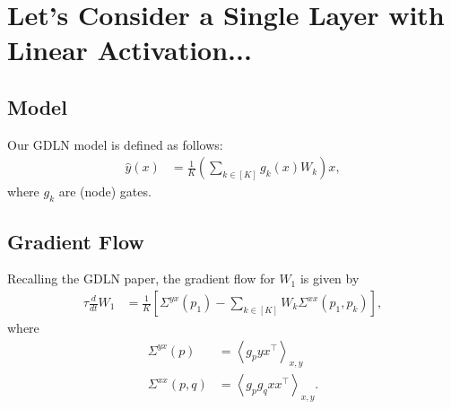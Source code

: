 \documentclass{article}
\begin{document}
\section{Let's Consider a Single Layer with Linear Activation...}

\subsection{Model}
Our GDLN model is defined as follows:
\begin{align}
  \hat{y}(x) &= \frac{1}{K} \left( \sum_{k \in [K]} g_k(x) W_k \right) x, \label{eq:gdln_model}
\end{align}
where $g_k$ are (node) gates.

\subsection{Gradient Flow}
Recalling the GDLN paper, the gradient flow for $W_1$ is given by
\begin{align}
  \tau \frac{d}{dt} W_1 &= \frac{1}{K} \left[ \Sigma^{yx}(p_1) - \sum_{k \in [K]} W_k \Sigma^{xx}(p_1,p_k) \right], \label{eq:grad_flow}
\end{align}
where
\begin{align}
  \Sigma^{yx}(p) &= \left\langle g_p y x^\top \right\rangle_{x,y} \\
  \Sigma^{xx}(p,q) &= \left\langle g_p g_q x x^\top \right\rangle_{x,y}.
\end{align}
\end{document}
